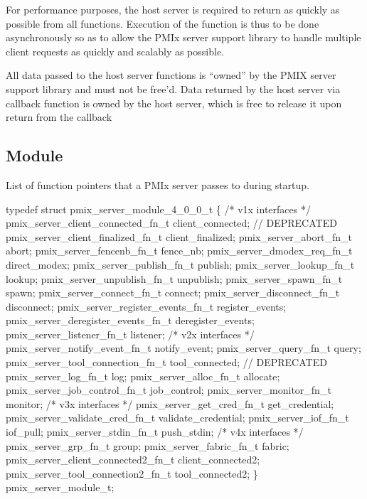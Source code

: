 \advicermstart
For performance purposes, the host server is required to return as quickly as possible from all functions. Execution of
the function is thus to be done asynchronously so as to allow the \ac{PMIx} server support library to handle multiple client requests
as quickly and scalably as possible.

All data passed to the host server functions is ``owned'' by the
PMIX server support library and must not be free'd. Data returned
by the host server via callback function is owned by the host
server, which is free to release it upon return from the callback
\advicermend

\subsection{ Module}
\label{server:module_fns}
\summary

List of function pointers that a PMIx server passes to  during startup.

\format

\cspecificstart
\begin{codepar}
typedef struct pmix_server_module_4_0_0_t \{
    /* v1x interfaces */
    pmix_server_client_connected_fn_t   client_connected;  // DEPRECATED
    pmix_server_client_finalized_fn_t   client_finalized;
    pmix_server_abort_fn_t              abort;
    pmix_server_fencenb_fn_t            fence_nb;
    pmix_server_dmodex_req_fn_t         direct_modex;
    pmix_server_publish_fn_t            publish;
    pmix_server_lookup_fn_t             lookup;
    pmix_server_unpublish_fn_t          unpublish;
    pmix_server_spawn_fn_t              spawn;
    pmix_server_connect_fn_t            connect;
    pmix_server_disconnect_fn_t         disconnect;
    pmix_server_register_events_fn_t    register_events;
    pmix_server_deregister_events_fn_t  deregister_events;
    pmix_server_listener_fn_t           listener;
    /* v2x interfaces */
    pmix_server_notify_event_fn_t       notify_event;
    pmix_server_query_fn_t              query;
    pmix_server_tool_connection_fn_t    tool_connected;    // DEPRECATED
    pmix_server_log_fn_t                log;
    pmix_server_alloc_fn_t              allocate;
    pmix_server_job_control_fn_t        job_control;
    pmix_server_monitor_fn_t            monitor;
    /* v3x interfaces */
    pmix_server_get_cred_fn_t           get_credential;
    pmix_server_validate_cred_fn_t      validate_credential;
    pmix_server_iof_fn_t                iof_pull;
    pmix_server_stdin_fn_t              push_stdin;
    /* v4x interfaces */
    pmix_server_grp_fn_t                group;
    pmix_server_fabric_fn_t             fabric;
    pmix_server_client_connected2_fn_t  client_connected2;
    pmix_server_tool_connection2_fn_t   tool_connected2;
\} pmix_server_module_t;
\end{codepar}
\cspecificend

